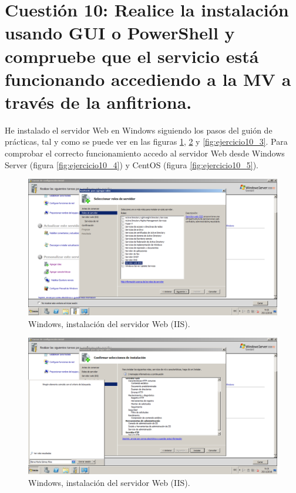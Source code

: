 
\section{Cuestión 10: Realice la instalación usando GUI o PowerShell y compruebe que el servicio está funcionando accediendo a la MV a través de la anfitriona.}


He instalado el servidor Web en Windows siguiendo los pasos del guión de prácticas, tal y como se puede ver en las figuras \ref{fig:ejercicio10_1}, \ref{fig:ejercicio10_2} y \ref{fig:ejercicio10_3}.
Para comprobar el correcto funcionamiento accedo al servidor Web desde Windows Server (figura \ref{fig:ejercicio10_4}) y CentOS (figura \ref{fig:ejercicio10_5}).

\begin{figure}[H] 
	\centering
	\includegraphics[width=15cm]{./img/ejercicio10_1.png} 	
	\caption{Windows, instalación del servidor Web (IIS).} \label{fig:ejercicio10_1}
\end{figure}

\begin{figure}[H] 
	\centering
	\includegraphics[width=15cm]{./img/ejercicio10_2.png} 	
	\caption{Windows, instalación del servidor Web (IIS).} \label{fig:ejercicio10_2}
\end{figure}

